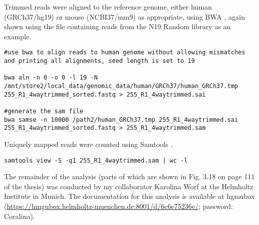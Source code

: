  Trimmed reads were aligned to the reference genome, either human (GRCh37/hg19) or mouse (NCBI37/mm9) as appropriate, using BWA \cite{Li:2009fi}, again shown using the file containing reads from the N19 Random library as an example.
 
\begin{lstlisting}
#use bwa to align reads to human genome without allowing mismatches and printing all alignments, seed length is set to 19

bwa aln -n 0 -o 0 -l 19 -N /mnt/store2/local_data/genomic_data/human/GRCh37/human_GRCh37.tmp 255_R1_4waytrimmed_sorted.fastq > 255_R1_4waytrimmed.sai

#generate the sam file
bwa samse -n 10000 /path2/human_GRCh37.tmp 255_R1_4waytrimmed.sai 255_R1_4waytrimmed_sorted.fastq > 255_R1_4waytrimmed.sam
 \end{lstlisting}

Uniquely mapped reads were counted using Samtools \cite{Li:2009kaa}.

\begin{lstlisting}
samtools view -S -q1 255_R1_4waytrimmed.sam | wc -l
\end{lstlisting}
 
The remainder of the analysis (parts of which are shown in Fig. 3.18 on page 111 of the thesis) was conducted by my collaborator Karolina Worf at the Helmholtz Institute in Munich. The documentation for this analysis is available at hgmubox (\url{https://hmgubox.helmholtz-muenchen.de:8001/d/6c6e75236e/}; password: Coralina). 

